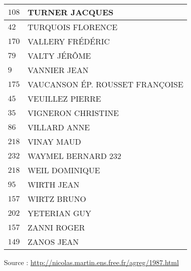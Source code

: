 \begin{xltabular}{\linewidth}{|l|X|}
    \hline
    $108$ & TURNER JACQUES \\
    \hline
    $42$ & TURQUOIS FLORENCE \\
    \hline
    $170$ & VALLERY FRÉDÉRIC \\
    \hline
    $79$ & VALTY JÉRÔME \\
    \hline
    $9$ & VANNIER JEAN \\
    \hline
    $175$ & VAUCANSON ÉP. ROUSSET FRANÇOISE \\
    \hline
    $45$ & VEUILLEZ PIERRE \\
    \hline
    $35$ & VIGNERON CHRISTINE \\
    \hline
    $86$ & VILLARD ANNE \\
    \hline
    $218$ & VINAY MAUD \\
    \hline
    $232$ & WAYMEL BERNARD 232 \\
    \hline
    $218$ & WEIL DOMINIQUE \\
    \hline
    $95$ & WIRTH JEAN \\
    \hline
    $157$ & WIRTZ BRUNO \\
    \hline
    $202$ & YETERIAN GUY \\
    \hline
    $157$ & ZANNI ROGER \\
    \hline
    $149$ & ZANOS JEAN \\
    \hline
  \end{xltabular}

  \begin{flushright}
    {\tiny Source : \url{http://nicolas.martin.ens.free.fr/agreg/1987.html}}
  \end{flushright}

